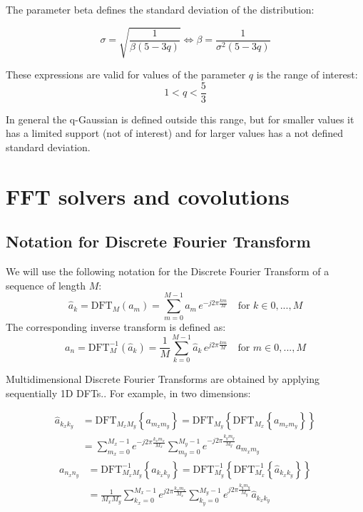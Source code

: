 The parameter beta defines the standard deviation of the distribution:

\begin{equation}
\sigma = \sqrt{\frac{1}{\beta(5-3 q)}} \iff \beta ={\frac{1}{\sigma^2(5-3 q)}}
\end{equation}



These expressions are valid for values of the parameter $q$ is   the range of interest:
\begin{equation}
1<q<\frac{5}{3}
\end{equation}

In general the q-Gaussian is defined outside this range, but for smaller values it has a limited support (not of interest) and for larger values has a not defined standard deviation.

\section{FFT solvers and covolutions}

\subsection{Notation for Discrete Fourier Transform}
We will use the following notation for the Discrete Fourier Transform of a sequence of length $M$:
\begin{equation}
\hat{a}_k = \text{DFT}_M(a_m) =  \sum_{m=0}^{M-1} a_m\, e^{-j2\pi  \frac{km}{M}}  \quad \text{for } k \in 0, ..., M
\end{equation}
The corresponding inverse transform is defined as:
\begin{equation}
{a}_n = \text{DFT}^{-1}_M(\hat{a}_k) =  \frac{1}{M}\sum_{k=0}^{M-1} \hat{a}_k\, e^{j2\pi  \frac{km}{M}}  \quad \text{for } m \in 0, ..., M
\end{equation}

Multidimensional Discrete Fourier Transforms are obtained by applying sequentially 1D DFTs.. For example, in two dimensions:

\begin{equation}
\begin{split}
\hat{a}_{k_xk_y} &= \text{DFT}_{M_xM_y}\left\{a_{m_xm_y}\right\}  
= \text{DFT}_{M_y} \left\{\text{DFT}_{M_x}\left\{a_{m_xm_y}\right\}\right\}\\  
&=\sum_{m_x=0}^{M_x-1} e^{-j 2\pi  \frac{k_x m_x}{M_x}} 
\sum_{m_y=0}^{M_y-1} e^{-j 2\pi  \frac{k_y m_y}{M_y}} a_{m_xm_y}
\end{split}
\end{equation}
\begin{equation}
\begin{split}
{a}_{n_xn_y} &= \text{DFT}^{-1}_{M_xM_y}\left\{a_{k_x k_y}\right\}  
= \text{DFT}^{-1}_{M_y} \left\{\text{DFT}^{-1}_{M_x}\left\{\hat{a}_{k_x k_y}\right\}\right\}\\  
&=\frac{1}{M_x M_y}\sum_{k_x=0}^{M_x-1} e^{j 2\pi  \frac{k_x m_x}{M_x}} 
\sum_{k_y=0}^{M_y-1} e^{j 2\pi  \frac{k_y m_y}{M_y}} \hat{a}_{k_xk_y}
\end{split}
\end{equation}



